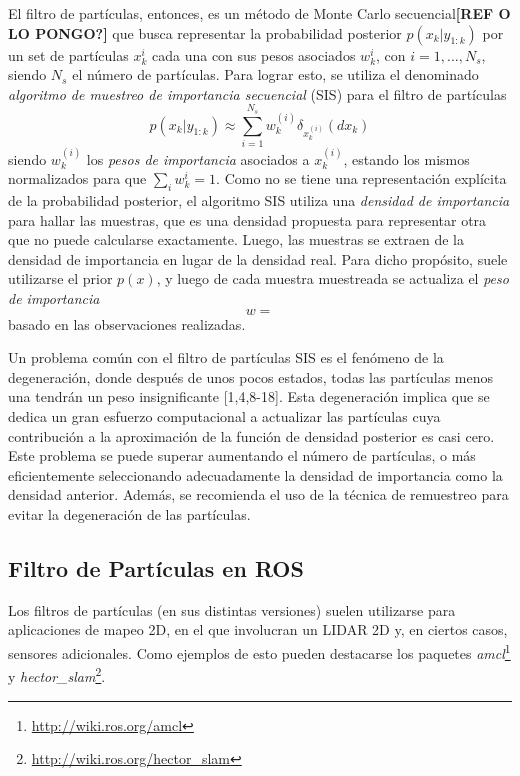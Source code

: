 El filtro de partículas, entonces, es un método de Monte Carlo secuencial\textbf{[REF O LO PONGO?]} que busca representar la probabilidad posterior $p(x_k|y_{1:k})$ por un set de partículas $x_k^i$ cada una con sus pesos asociados $w_k^i$, con $i=1,...,N_s$, siendo $N_s$ el número de partículas. Para lograr esto, se utiliza el denominado \textit{algoritmo de muestreo de importancia secuencial} (SIS) para el filtro de partículas
\begin{equation}
    p(x_k|y_{1:k}) \approx \sum_{i=1}^{N_s}w_k^{(i)}\delta_{x_k^{(i)}}(dx_k)
\end{equation}
siendo $w_k^{(i)}$ los \textit{pesos de importancia} asociados a $x_k^{(i)}$, estando los mismos normalizados para que $\sum_i w_k^i = 1$. Como no se tiene una representación explícita de la probabilidad posterior, el algoritmo SIS utiliza una \textit{densidad de importancia} para hallar las muestras, que es una densidad propuesta para representar otra que no puede calcularse exactamente. Luego, las muestras se extraen de la densidad de importancia en lugar de la densidad real. Para dicho propósito, suele utilizarse el prior $p(x)$, y luego de cada muestra muestreada se actualiza el \textit{peso de importancia}
\begin{equation}
    w = 
\end{equation}
basado en las observaciones realizadas.

Un problema común con el filtro de partículas SIS es el fenómeno de la degeneración, donde después de unos pocos estados, todas las partículas menos una tendrán un peso insignificante [1,4,8-18]. Esta degeneración implica que se dedica un gran esfuerzo computacional a actualizar las partículas cuya contribución a la aproximación de la función de densidad posterior es casi cero. Este problema se puede superar aumentando el número de partículas, o más eficientemente seleccionando adecuadamente la densidad de importancia como la densidad anterior. Además, se recomienda el uso de la técnica de remuestreo para evitar la degeneración de las partículas.

\subsection{Filtro de Partículas en ROS}
Los filtros de partículas (en sus distintas versiones) suelen utilizarse para aplicaciones de mapeo 2D, en el que involucran un LIDAR 2D y, en ciertos casos, sensores adicionales. Como ejemplos de esto pueden destacarse los paquetes \textit{amcl}\footnote{\url{http://wiki.ros.org/amcl}} y \textit{hector\_slam}\footnote{\url{http://wiki.ros.org/hector_slam}}.